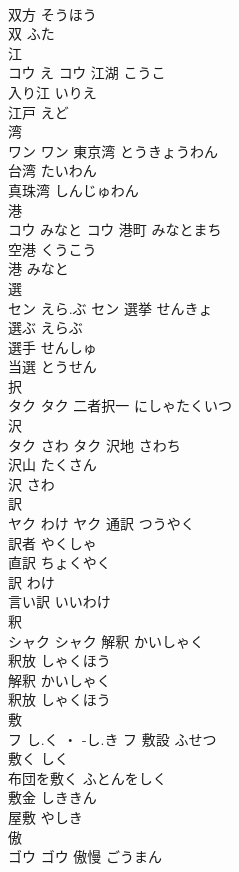 \documentclass[8pt]{extreport}
\begin{document}
\begin{CJK}{UTF8}{min}
\\	双方	そうほう	
\\	双	ふた	
\\	江	
\\	コウ	え	コウ	江湖	こうこ	
\\	入り江	いりえ	
\\	江戸	えど	
\\	湾	
\\	ワン		ワン	東京湾	とうきょうわん	
\\	台湾	たいわん	
\\	真珠湾	しんじゅわん	
\\	港	
\\	コウ	みなと	コウ	港町	みなとまち	
\\	空港	くうこう	
\\	港	みなと	
\\	選	
\\	セン	えら.ぶ	セン	選挙	せんきょ	
\\	選ぶ	えらぶ	
\\	選手	せんしゅ	
\\	当選	とうせん	
\\	択	
\\	タク		タク													二者択一	にしゃたくいつ	
\\	沢	
\\	タク	さわ	タク	沢地	さわち	
\\	沢山	たくさん	
\\	沢	さわ	
\\	訳	
\\	ヤク	わけ	ヤク	通訳	つうやく	
\\	訳者	やくしゃ	
\\	直訳	ちょくやく	
\\	訳	わけ	
\\	言い訳	いいわけ	
\\	釈	
\\	シャク		シャク	解釈	かいしゃく	
\\	釈放	しゃくほう	
\\	解釈	かいしゃく	
\\	釈放	しゃくほう	
\\	敷	
\\	フ	し.く ・ -し.き	フ	敷設	ふせつ	
\\	敷く	しく	
\\	布団を敷く	ふとんをしく	
\\	敷金	しききん	
\\	屋敷	やしき	
\\	傲	
\\	ゴウ		ゴウ	傲慢	ごうまん	

\end{CJK}
\end{document}
